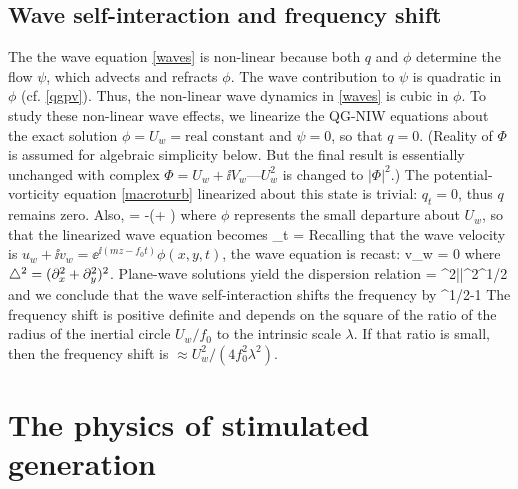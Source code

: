 \documentclass{jfm}
\begin{document}
\subsection{Wave self-interaction and frequency shift}
The the wave equation \eqref{waves} is non-linear because both $q$ and $\phi$
determine the flow $\psi$, which advects and refracts $\phi$. The wave contribution
to $\psi$ is quadratic in $\phi$ (cf. \eqref{qgpv}). Thus, the non-linear wave
dynamics in   \eqref{waves} is cubic in $\phi$.
To study these non-linear wave effects, we linearize the QG-NIW equations  about
 the exact solution
$\phi = U_w = \text{real constant}$ and $\psi = 0$, so that $q=0$. (Reality of
$\Phi$ is assumed for algebraic simplicity below. But the final result is
essentially unchanged
with complex $\Phi = U_w + \ii V_w$---$U_w^2$ is changed to $|\Phi|^2$.) The potential-vorticity
equation \eqref{macroturb} linearized about this state is trivial: $q_t = 0$,
 thus $q$ remains zero. Also,
\beq
\label{lin_q}
 \lap \psi = -\lap\half(\phi + \phis)\com
\eeq
where $\phi$ represents the small departure about $U_w$, so that
the linearized wave equation becomes
\beq
\phi_t =  \per
\eeq
Recalling that the wave velocity is $u_w + \ii v_w = \ee^{\ii (mz -f_0 t)}\phi(x,y,t)$,
the wave equation is recast:
\beq
{} v_w = 0\com
\eeq
where $\triangle^2 = (\partial_x^2 + \partial_y^2)^2$. Plane-wave solutions yield the
dispersion relation
\beq
{} = \half \lambda^2|\kb|^2^{1/2}\com
\eeq
and we conclude that the wave self-interaction shifts the frequency by
\beq
{}^{1/2}-1\per
\eeq
The frequency shift is positive definite and depends on the square of the ratio
of the radius of the inertial circle $U_w/f_0$ to the intrinsic scale $\lambda$.
If that
ratio is small, then the frequency shift is  $\approx  U_w^2/(4 f_0^2\lambda^2)$.

\section{The physics of stimulated generation}
\end{document}
